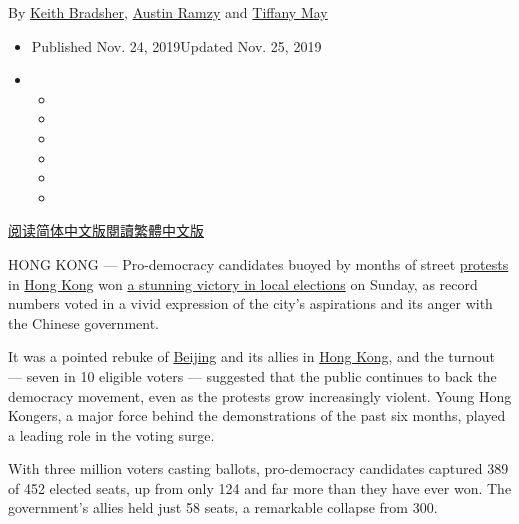 By \href{https://www.nytimes3xbfgragh.onion/by/keith-bradsher}{Keith
Bradsher},
\href{https://www.nytimes3xbfgragh.onion/by/austin-ramzy}{Austin Ramzy}
and \href{https://www.nytimes3xbfgragh.onion/by/tiffany-may}{Tiffany
May}

\begin{itemize}
\item
  Published Nov. 24, 2019Updated Nov. 25, 2019
\item
  \begin{itemize}
  \item
  \item
  \item
  \item
  \item
  \item
  \end{itemize}
\end{itemize}

\href{https://cn.nytimes3xbfgragh.onion/china/20191125/hong-kong-election/}{阅读简体中文版}\href{https://cn.nytimes3xbfgragh.onion/china/20191125/hong-kong-election/zh-hant/}{閱讀繁體中文版}

HONG KONG --- Pro-democracy candidates buoyed by months of street
\href{https://www.nytimes3xbfgragh.onion/2019/11/25/world/asia/hong-kong-election-protests.html}{protests}
in
\href{https://www.nytimes3xbfgragh.onion/2019/11/25/world/asia/hong-kong-election-protests.html}{Hong
Kong} won
\href{https://www.nytimes3xbfgragh.onion/interactive/2019/11/24/world/asia/hong-kong-election-results.html}{a
stunning victory in local elections} on Sunday, as record numbers voted
in a vivid expression of the city's aspirations and its anger with the
Chinese government.

It was a pointed rebuke of
\href{https://www.nytimes3xbfgragh.onion/2019/11/25/world/asia/hong-kong-election-protests.html}{Beijing}
and its allies in
\href{https://www.nytimes3xbfgragh.onion/2019/11/25/world/asia/hong-kong-election-protests.html}{Hong
Kong}, and the turnout --- seven in 10 eligible voters --- suggested
that the public continues to back the democracy movement, even as the
protests grow increasingly violent. Young Hong Kongers, a major force
behind the demonstrations of the past six months, played a leading role
in the voting surge.

With three million voters casting ballots, pro-democracy candidates
captured 389 of 452 elected seats, up from only 124 and far more than
they have ever won. The government's allies held just 58 seats, a
remarkable collapse from 300.

